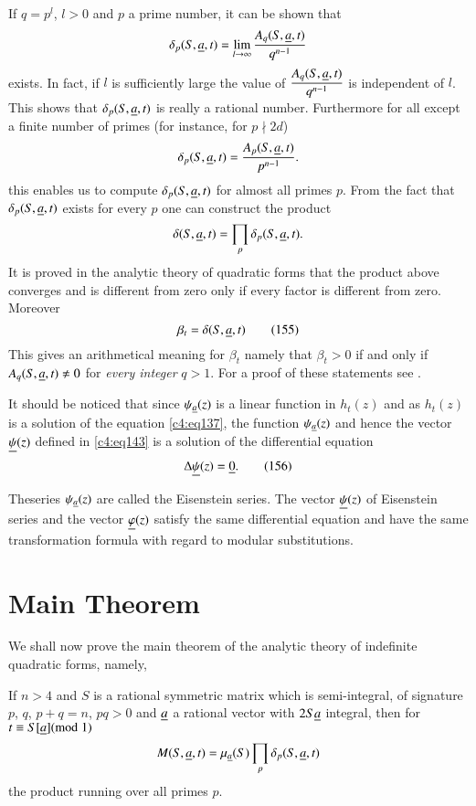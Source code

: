 If $q=p^{l}$, $l>0$ and $p$ a prime number, it can be shown that
$$
\delta_{p}(S,\underline{a},t)=\lim\limits_{l \to
  \infty}\frac{A_{q}(S,\underline{a},t)}{q^{n-1}}
$$\pageoriginale
exists. In fact, if $l$ is sufficiently large the value of
$\dfrac{A_{q}(S,\underline{a},t)}{q^{n-1}}$ is independent of $l$. This shows
that $\delta_{p}(S,\underline{a},t)$ is really a rational number. Furthermore
for all except a finite number of primes (for instance, for $p\nmid
2d$)
$$
\delta_{p}(S,\underline{a},t)=\frac{A_{p}(S,\underline{a},t)}{p^{n-1}}.
$$
this enables us to compute $\delta_{p}(S,\underline{a},t)$ for almost all
primes $p$. From the fact that $\delta_{p}(S,\underline{a},t)$ exists for
every $p$ one can construct the product
$$
\delta(S,\underline{a},t)=\prod_{p}\delta_{p}(S,\underline{a},t).
$$
It is proved in the analytic theory of quadratic forms that the
product above converges and is different from zero only if every
factor is different from zero. Moreover
\begin{equation*}
\beta_{t}=\delta(S,\underline{a},t)\tag{155}\label{c4:eq155}
\end{equation*}
This gives an arithmetical meaning for $\beta_{t}$ namely that
$\beta_{t}>0$ if and only if $A_{q}(S,\underline{a},t)\neq 0$ for {\em every
  integer} $q>1$. For a proof of these statements see \cite{c4:key2}.

It should be noticed that since $\psi_{\underline{a}}(z)$ is a linear
function in $h_{t}(z)$ and as $h_{t}(z)$ is a solution of the equation
\eqref{c4:eq137}, the function $\psi_{\underline{a}}(z)$ and hence the vector
$\underline{\psi}(z)$ defined in \eqref{c4:eq143} is a solution of the
differential equation
\begin{equation*}
\Delta\underline{\psi}(z)=\underline{0}.\tag{156}\label{c4:eq156}
\end{equation*}

The\pageoriginale series $\psi_{\underline{a}}(z)$ are called the Eisenstein
series. The vector $\underline{\psi}(z)$ of Eisenstein series and the vector
$\underline{\varphi}(z)$ satisfy the same differential equation and have the
same transformation formula with regard to modular substitutions.

\section{Main Theorem}\label{chap4:sec9}

We shall now prove the main theorem of the analytic theory of
indefinite quadratic forms, namely,

\begin{thm}\label{chap4:thm11}
If $n>4$ and $S$ is a rational symmetric matrix which is
semi-integral, of signature $p$, $q$, $p+q=n$, $pq>0$ and $\underline{a}$ a
rational vector with $2S\underline{a}$ integral, then for $t\equiv
S[\underline{a}](\rm{mod} \; 1) $
$$
M(S,\underline{a},t)=\mu_{\underline{a}}(S)\prod_{p}\delta_{p}(S,\underline{a},t)
$$
the product running over all primes $p$.
\end{thm}

